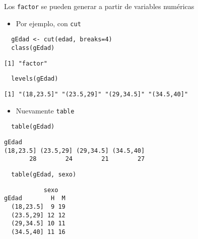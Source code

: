 \documentclass[xcolor={usenames,svgnames,dvipsnames}]{beamer}
\begin{document}
\begin{frame}[fragile,label=sec-1-6]{Los \texttt{factor} se pueden generar a partir de variables numéricas}
 \begin{itemize}
\item Por ejemplo, con \texttt{cut}
\end{itemize}
\lstset{language=R,label= ,caption= ,numbers=none}
\begin{lstlisting}
  gEdad <- cut(edad, breaks=4)
  class(gEdad)
\end{lstlisting}

\begin{verbatim}
[1] "factor"
\end{verbatim}

\lstset{language=R,label= ,caption= ,numbers=none}
\begin{lstlisting}
  levels(gEdad)
\end{lstlisting}

\begin{verbatim}
[1] "(18,23.5]" "(23.5,29]" "(29,34.5]" "(34.5,40]"
\end{verbatim}

\begin{itemize}
\item Nuevamente \texttt{table}
\end{itemize}
\lstset{language=R,label= ,caption= ,numbers=none}
\begin{lstlisting}
  table(gEdad)
\end{lstlisting}

\begin{verbatim}
gEdad
(18,23.5] (23.5,29] (29,34.5] (34.5,40] 
       28        24        21        27
\end{verbatim}

\lstset{language=R,label= ,caption= ,numbers=none}
\begin{lstlisting}
  table(gEdad, sexo)
\end{lstlisting}

\begin{verbatim}
           sexo
gEdad        H  M
  (18,23.5]  9 19
  (23.5,29] 12 12
  (29,34.5] 10 11
  (34.5,40] 11 16
\end{verbatim}
\end{frame}
\end{document}
